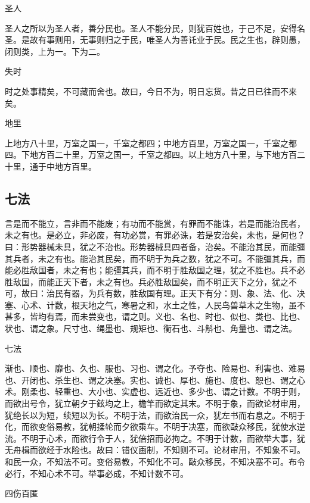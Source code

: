\documentclass[]{article}
\begin{document}
圣人

圣人之所以为圣人者，善分民也。圣人不能分民，则犹百姓也，于己不足，安得名圣。是故有事则用，无事则归之于民，唯圣人为善讬业于民。民之生也，辟则愚，闭则类，上为一。下为二。

失时

时之处事精矣，不可藏而舍也。故曰，今日不为，明日忘货。昔之日已往而不来矣。

地里

上地方八十里，万室之国一，千室之都四；中地方百里，万室之国一，千室之都四。下地方百二十里，万室之国一，千室之都四。以上地方八十里，与下地方百二十里，通于中地方百里。

\hypertarget{header-n98}{%
\subsection{七法}\label{header-n98}}

言是而不能立，言非而不能废；有功而不能赏，有罪而不能诛，若是而能治民者，未之有也。是必立，非必废，有功必赏，有罪必诛，若是安治矣，未也，是何也？曰：形势器械未具，犹之不治也。形势器械具四者备，治矣。不能治其民，而能彊其兵者，未之有也。能治其民矣，而不明于为兵之数，犹之不可。不能彊其兵，而能必胜敌国者，未之有也；能彊其兵，而不明于胜敌国之理，犹之不胜也。兵不必胜敌国，而能正天下者，未之有也。兵必胜敌国矣，而不明正天下之分，犹之不可，故曰：治民有器，为兵有数，胜敌国有理。正天下有分：则、象、法、化、决塞、心术、计数，根天地之气，寒暑之和，水土之性，人民鸟兽草木之生物，虽不甚多，皆均有焉，而未尝变也，谓之则。义也、名也、时也、似也、类也、比也、状也、谓之象。尺寸也、绳墨也、规矩也、衡石也、斗斛也、角量也、谓之法。

七法

渐也、顺也、靡也、久也、服也、习也、谓之化。予夺也、险易也、利害也、难易也、开闭也、杀生也、谓之决塞。实也、诚也、厚也、施也、度也、恕也、谓之心术。刚柔也、轻重也、大小也、实虚也、远近也、多少也、谓之计数。不明于则，而欲出号令，犹立朝夕于鉉均之上，檐竿而欲定其末。不明于象，而欲论材审用，犹绝长以为短，续短以为长。不明于法，而欲治民一众，犹左书而右息之。不明于化，而欲变俗易教，犹朝揉轮而夕欲乘车。不明于决塞，而欲敺众移民，犹使水逆流。不明于心术，而欲行令于人，犹倍招而必拘之。不明于计数，而欲举大事，犹无舟楫而欲经于水险也。故曰：错仪画制，不知则不可。论材审用，不知象不可。和民一众，不知法不可。变俗易教，不知化不可。敺众移民，不知决塞不可。布令必行，不知心术不可。举事必成，不知计数不可。

四伤百匿
\end{document}
